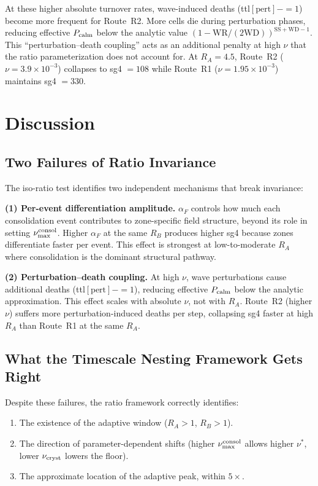 \documentclass[11pt]{article}
\begin{document}
At these higher absolute turnover rates, wave-induced deaths (ttl$[\text{pert}]
-= 1$) become more frequent for Route~R2. More cells die during perturbation
phases, reducing effective $P_{\rm calm}$ below the analytic value
$(1 - \text{WR}/(2\text{WD}))^{\text{SS}+\text{WD}-1}$. This
``perturbation--death coupling'' acts as an additional penalty at high $\nu$
that the ratio parameterization does not account for. At $R_A = 4.5$,
Route~R2 ($\nu = 3.9\times10^{-3}$) collapses to sg4 $= 108$ while Route~R1
($\nu = 1.95\times10^{-3}$) maintains sg4 $= 330$.

\section{Discussion}

\subsection{Two Failures of Ratio Invariance}

The iso-ratio test identifies two independent mechanisms that break invariance:

\textbf{(1) Per-event differentiation amplitude.} $\alpha_F$ controls how much
each consolidation event contributes to zone-specific field structure, beyond
its role in setting $\nu_{\rm max}^{\rm consol}$. Higher $\alpha_F$ at the
same $R_B$ produces higher sg4 because zones differentiate faster per event.
This effect is strongest at low-to-moderate $R_A$ where consolidation is the
dominant structural pathway.

\textbf{(2) Perturbation--death coupling.} At high $\nu$, wave perturbations
cause additional deaths (ttl$[\text{pert}] -= 1$), reducing effective $P_{\rm calm}$
below the analytic approximation. This effect scales with absolute $\nu$, not
with $R_A$. Route~R2 (higher $\nu$) suffers more perturbation-induced deaths
per step, collapsing sg4 faster at high $R_A$ than Route~R1 at the same $R_A$.

\subsection{What the Timescale Nesting Framework Gets Right}

Despite these failures, the ratio framework correctly identifies:
\begin{enumerate}
\item The existence of the adaptive window ($R_A > 1$, $R_B > 1$).
\item The direction of parameter-dependent shifts (higher $\nu_{\rm max}^{\rm consol}$
  allows higher $\nu^*$, lower $\nu_{\rm cryst}$ lowers the floor).
\item The approximate location of the adaptive peak, within $5\times$.
\end{enumerate}
\end{document}
